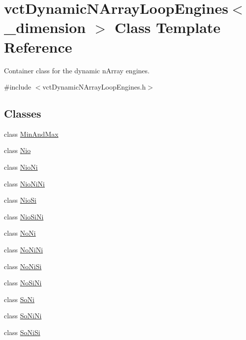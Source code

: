 \hypertarget{classvct_dynamic_n_array_loop_engines}{}\section{vct\+Dynamic\+N\+Array\+Loop\+Engines$<$ \+\_\+dimension $>$ Class Template Reference}
\label{classvct_dynamic_n_array_loop_engines}


Container class for the dynamic n\+Array engines.  




{\ttfamily \#include $<$vct\+Dynamic\+N\+Array\+Loop\+Engines.\+h$>$}

\subsection*{Classes}
\begin{DoxyCompactItemize}
\item 
class \hyperlink{classvct_dynamic_n_array_loop_engines_1_1_min_and_max}{Min\+And\+Max}
\item 
class \hyperlink{classvct_dynamic_n_array_loop_engines_1_1_nio}{Nio}
\item 
class \hyperlink{classvct_dynamic_n_array_loop_engines_1_1_nio_ni}{Nio\+Ni}
\item 
class \hyperlink{classvct_dynamic_n_array_loop_engines_1_1_nio_ni_ni}{Nio\+Ni\+Ni}
\item 
class \hyperlink{classvct_dynamic_n_array_loop_engines_1_1_nio_si}{Nio\+Si}
\item 
class \hyperlink{classvct_dynamic_n_array_loop_engines_1_1_nio_si_ni}{Nio\+Si\+Ni}
\item 
class \hyperlink{classvct_dynamic_n_array_loop_engines_1_1_no_ni}{No\+Ni}
\item 
class \hyperlink{classvct_dynamic_n_array_loop_engines_1_1_no_ni_ni}{No\+Ni\+Ni}
\item 
class \hyperlink{classvct_dynamic_n_array_loop_engines_1_1_no_ni_si}{No\+Ni\+Si}
\item 
class \hyperlink{classvct_dynamic_n_array_loop_engines_1_1_no_si_ni}{No\+Si\+Ni}
\item 
class \hyperlink{classvct_dynamic_n_array_loop_engines_1_1_so_ni}{So\+Ni}
\item 
class \hyperlink{classvct_dynamic_n_array_loop_engines_1_1_so_ni_ni}{So\+Ni\+Ni}
\item 
class \hyperlink{classvct_dynamic_n_array_loop_engines_1_1_so_ni_si}{So\+Ni\+Si}
\end{DoxyCompactItemize}
